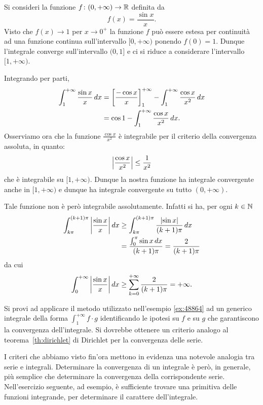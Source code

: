 \begin{example}
\label{ex:48864}%
\mymark{*}%
Si consideri la funzione $f\colon (0,+\infty) \to \mathbb R$
definita da
\[
  f(x) = \frac{\sin x }{x}.
\]
Visto che $f(x)\to 1$ per $x\to 0^+$ la funzione $f$
può essere estesa per continuità ad una funzione continua sull'intervallo
$[0,+\infty)$ ponendo $f(0)=1$.
Dunque l'integrale converge sull'intervallo $(0,1]$ e ci si
riduce a considerare l'intervallo $[1,+\infty)$.

Integrando per parti,
\begin{align*}
  \int_1^{+\infty} \frac{\sin x}{x}\, dx
  &= {\left[ \frac{-\cos x}{x} \right]}_1^{+\infty} -
  \int_1^{+\infty} \frac{\cos x}{x^2} \, dx \\
  &= \cos 1 - \int_1^{+\infty} \frac{\cos x}{x^2}\, dx.
\end{align*}
Osserviamo ora che la funzione $\frac{\cos x}{x^2}$ è integrabile
per il criterio della convergenza assoluta, in quanto:
\[
  {\left|\frac{\cos x}{x^2}\right|} \le \frac{1}{x^2}
\]
che è integrabile su $[1,+\infty)$.
Dunque la nostra funzione ha integrale convergente anche in $[1,+\infty)$
e dunque ha integrale convergente su tutto $(0,+\infty)$.

Tale funzione non è però integrabile assolutamente.
Infatti si ha,
per ogni $k\in \mathbb N$
\begin{align*}
  \int_{k\pi}^{(k+1)\pi} {\left|\frac{\sin x} x\right|}\, dx
  &\ge \int_{k\pi}^{(k+1)\pi} \frac{{\left|\sin x\right|}}{(k+1)\pi}\, dx\\
  &= \frac{\int_0^\pi \sin x \, dx}{(k+1)\pi}
  = \frac{2}{(k+1)\pi}
\end{align*}
da cui
\[
  \int_0^{+\infty} {\left|\frac{\sin x}{x}\right|}\, dx
  \ge \sum_{k=0}^{+\infty} \frac{2}{(k+1)\pi} = +\infty.
\]
\end{example}

\begin{exercise}
  Si provi ad applicare il metodo utilizzato nell'esempio \ref{ex:48864} ad 
  un generico integrale della forma $\int_1^{+\infty} f\cdot g$ identificando le ipotesi 
  su $f$ e su $g$ che garantiscono la convergenza dell'integrale.
  Si dovrebbe ottenere un criterio analogo al teorema~\ref{th:dirichlet} di Dirichlet
  per la convergenza delle serie.
\end{exercise}


I criteri che abbiamo visto fin'ora mettono in evidenza una notevole
analogia tra serie e integrali. Determinare la convergenza
di un integrale è però, in generale, più semplice che determinare
la convergenza della corrispondente serie.
Nell'esercizio seguente, ad esempio, è sufficiente trovare una primitiva
delle funzioni integrande, per determinare il carattere dell'integrale.

